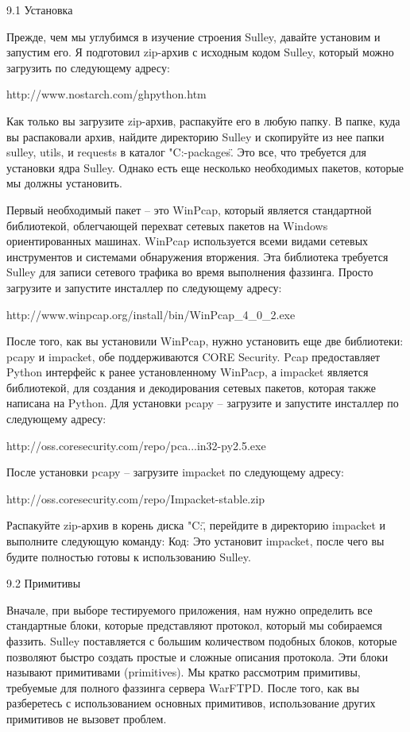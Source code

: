 \documentclass[12pt, a4paper, oneside]{book}
\begin{document}
9.1 Установка

Прежде, чем мы углубимся в изучение строения Sulley, давайте установим и запустим его. Я подготовил zip-архив с исходным кодом Sulley, который можно загрузить по следующему адресу:

http://www.nostarch.com/ghpython.htm

Как только вы загрузите zip-архив, распакуйте его в любую папку. В папке, куда вы распаковали архив, найдите директорию Sulley и скопируйте из нее папки sulley, utils, и requests в каталог "C:\Lib\site-packages\". Это все, что требуется для установки ядра Sulley. Однако есть еще несколько необходимых пакетов, которые мы должны установить.

Первый необходимый пакет – это WinPcap, который является стандартной библиотекой, облегчающей перехват сетевых пакетов на Windows ориентированных машинах. WinPcap используется всеми видами сетевых инструментов и системами обнаружения вторжения. Эта библиотека требуется Sulley для записи сетевого трафика во время выполнения фаззинга. Просто загрузите и запустите инсталлер по следующему адресу:

http://www.winpcap.org/install/bin/WinPcap\_4\_0\_2.exe

После того, как вы установили WinPcap, нужно установить еще две библиотеки: pcapy и impacket, обе поддерживаются CORE Security. Pcap предоставляет Python интерфейс к ранее установленному WinPacp, а impacket является библиотекой, для создания и декодирования сетевых пакетов, которая также написана на Python. Для установки pcapy – загрузите и запустите инсталлер по следующему адресу:

http://oss.coresecurity.com/repo/pca...in32-py2.5.exe

После установки pcapy – загрузите impacket по следующему адресу:

http://oss.coresecurity.com/repo/Impacket-stable.zip

Распакуйте zip-архив в корень диска "C:\", перейдите в директорию impacket и выполните следующую команду:
Код:
Это установит impacket, после чего вы будите полностью готовы к использованию Sulley.


9.2 Примитивы

Вначале, при выборе тестируемого приложения, нам нужно определить все стандартные блоки, которые представляют протокол, который мы собираемся фаззить. Sulley поставляется с большим количеством подобных блоков, которые позволяют быстро создать простые и сложные описания протокола. Эти блоки называют примитивами (primitives). Мы кратко рассмотрим примитивы, требуемые для полного фаззинга сервера WarFTPD. После того, как вы разберетесь с использованием основных примитивов, использование других примитивов не вызовет проблем.
\end{document}
